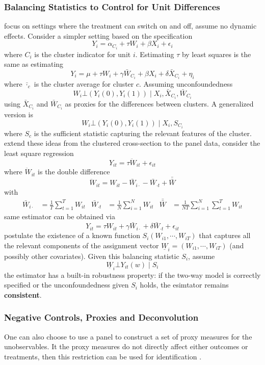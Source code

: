 \documentclass[twoside]{article}
\begin{document}
\subsubsection{Balancing Statistics to Control for Unit Differences}
\citet{arkhangelsky2022doubly} focus on settings where the treatment can switch on and off, assume no dynamic effects.
Consider a simpler setting based on the specification $$ Y_i = \alpha_{C_i} + \tau W_i + \beta X_i + \epsilon_i $$
where $C_i$ is the cluster indicator for unit $i$. Estimating $\tau$ by least squares is the same as estimating $$ Y_i = \mu + \tau W_i + \gamma \bar{W}_{C_i} + \beta X_i + \delta \bar{X}_{C_i} + \eta_i $$
where $\bar{\cdot}_c$ is the cluster average for cluster $c$. Assuming unconfoundedness
$$ W_i \bot \left(Y_i(0),Y_i(1)\right) \mid X_i,\bar{X}_{C_i},\bar{W}_{C_i} $$
using $\bar{X}_{C_i}$ and $\bar{W}_{C_i}$ as proxies for the differences between clusters. A generalized version is 
$$ W_i \bot \left(Y_i(0),Y_i(1)\right)\mid X_i,S_{C_i} $$
where $S_c$ is the sufficient statistic capturing the relevant features of the cluster. \citet{arkhangelsky2022doubly} extend these ideas from the clustered cross-section to the panel data, 
consider the least square regression $$ Y_{it} = \tau \ddot{W}_{it}+\epsilon_{it} $$
where $\ddot{W}_{it}$ is the double difference $$ \ddot{W}_{it} = W_{it} - \bar{W}_{i\cdot} -\bar{W}_{\cdot t} + \bar{\bar{W}} $$
with
\begin{align*}
    \bar{W}_{i\cdot} &= \frac{1}{T}\sum^T_{t=1}W_{it} & \bar{W}_{\cdot t} &= \frac{1}{N}\sum^N_{i=1}W_{it} & \bar{\bar{W}} &= \frac{1}{NT}\sum^N_{i=1}\sum^T_{t=1}W_{it}
\end{align*}
same estimator can be obtained via $$ Y_{it} = \tau W_{it} + \gamma \bar{W}_{i\cdot} + \delta\bar{W}_{\cdot t} + \epsilon_{it} $$
\citet{arkhangelsky2022doubly} postulate the existence of a known function $S_i\left(W_{i1},\cdots,W_{iT}\right)$ that captures all the relevant components of the assignment vector $\underline{W}_i = \left(W_{i1},\cdots,W_{iT}\right)$ (and possibly other covariates). Given this balancing statistic $S_i$, assume $$ \underline{W}_i \bot Y_{it}(w) \mid S_i $$
the estimator has a built-in robustness property: if the two-way model is correctly specified or the unconfoundedness given $S_i$ holds, the esimtator remains \textbf{consistent}.

\subsubsection{Negative Controls, Proxies and Deconvolution}
One can also choose to use a panel to construct a set of proxy measures for the unobservables. It the proxy measures do not directly affect either outcomes or treatments, then this restriction can be used for identification \citep{ying2023proximal}.
\end{document}
